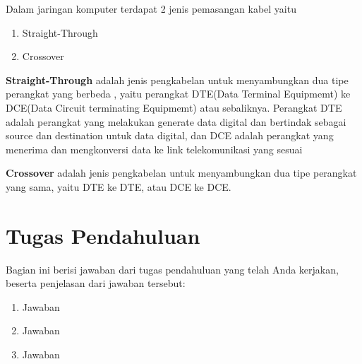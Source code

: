 Dalam jaringan komputer terdapat 2 jenis pemasangan kabel yaitu
\begin{enumerate}
	\item Straight-Through
	\item Crossover
\end{enumerate}

\textbf{Straight-Through} adalah jenis pengkabelan untuk menyambungkan dua tipe perangkat yang berbeda
, yaitu perangkat DTE(Data Terminal Equipmemt) ke DCE(Data Circuit terminating Equipmemt) atau sebaliknya.
Perangkat DTE adalah perangkat yang melakukan generate data digital dan bertindak sebagai source dan destination
untuk data digital, dan DCE adalah perangkat yang menerima dan mengkonversi data ke link telekomunikasi
yang sesuai

\textbf{Crossover} adalah jenis pengkabelan untuk menyambungkan dua tipe perangkat yang sama, yaitu DTE ke
DTE, atau DCE ke DCE.


\section{Tugas Pendahuluan}
Bagian ini berisi jawaban dari tugas pendahuluan yang telah Anda kerjakan, beserta penjelasan dari jawaban tersebut:

\begin{enumerate}
    \item Jawaban
    \item Jawaban
    \item Jawaban
\end{enumerate}
